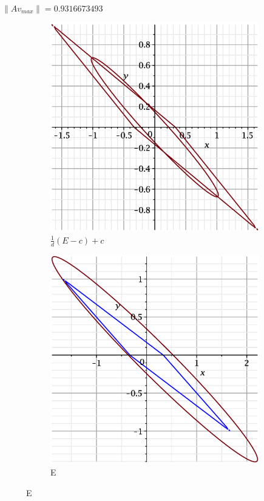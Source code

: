 \documentclass{beamer}
\begin{document}
\begin{frame}
$\|Av_{max}\| = 0.9316673493$  
    \begin{figure}
    \begin{subfigure}{.5\textwidth}
        \centering
        \includegraphics[width=.8\linewidth]{pictures/8.eps}
        \caption{$\displaystyle\frac{1}{d}(E-c)+c$}
    \label{fig:sfig1}
    \end{subfigure}%
    \begin{subfigure}{.5\textwidth}
        \centering
        \includegraphics[width=.8\linewidth]{pictures/1_8.eps}
        \caption{E}
    \label{fig:sfig2}
    \end{subfigure}
\end{figure}

\end{frame}
\end{document}

